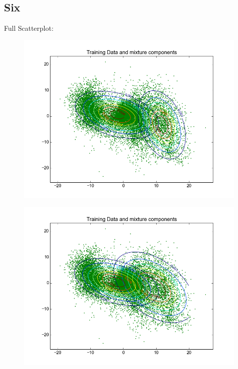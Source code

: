 \documentclass[11pt,a4paper]{article}
\begin{document}
\subsection{Six}
Full Scatterplot: \\
\begin{minipage}[b]{0.25\textwidth}
\begin{figure}[H]
  \centering
  \includegraphics[width=.8\linewidth]{Figures/contours_digitsix0.png}
  \label{fig:sfig1}
\end{figure}%
\end{minipage}
\begin{minipage}[b]{0.25\textwidth}
\begin{figure}[H]
  \centering
  \includegraphics[width=.8\linewidth]{Figures/contours_digitsix5.png}

  \label{fig:sfig1}
\end{figure}%
\end{minipage}
\end{document}
